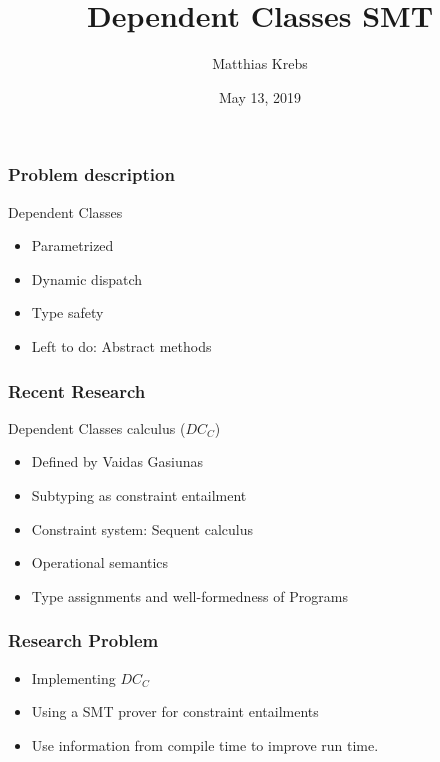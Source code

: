 \documentclass[leqno]{beamer}
\title{Dependent Classes SMT}
\author{Matthias Krebs}
\date{May 13, 2019}
\begin{document}
\maketitle


\begin{frame}
    \frametitle{Problem description}
    Dependent Classes
    \begin{itemize}
        \item Parametrized
        \item Dynamic dispatch
        \item Type safety
        \item Left to do: Abstract methods
    \end{itemize}
\end{frame}

\begin{frame}
    \frametitle{Recent Research}
    Dependent Classes calculus ($DC_C$)
    \begin{itemize}
        \item Defined by Vaidas Gasiunas
        \item Subtyping as constraint entailment
        \item Constraint system: Sequent calculus
        \item Operational semantics
        \item Type assignments and well-formedness of Programs
    \end{itemize}
\end{frame}

\begin{frame}
    \frametitle{Research Problem}
    \begin{itemize}
        \item Implementing $DC_C$
        \item Using a SMT prover for constraint entailments
        \item Use information from compile time to improve run time.
    \end{itemize}
\end{frame}
\end{document}
